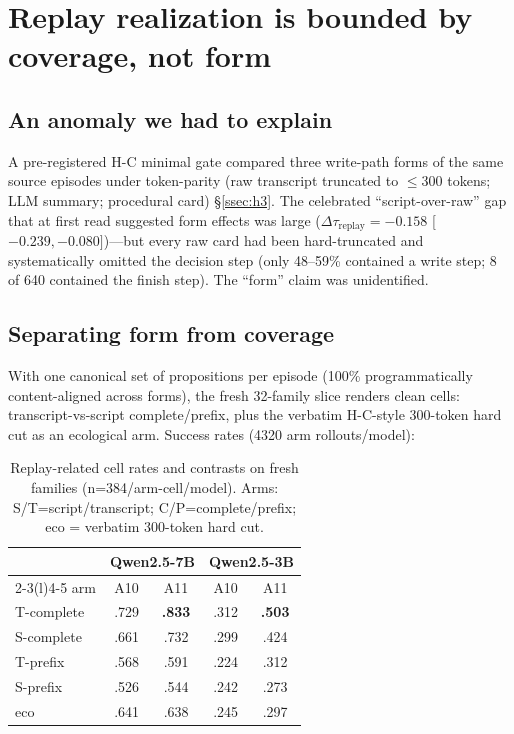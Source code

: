 \section{Replay realization is bounded by coverage, not form}
\label{sec:realization}

\subsection{An anomaly we had to explain}
\label{ssec:hc}

A pre-registered H-C minimal gate compared three write-path forms of the same source episodes under token-parity (raw transcript truncated to $\le$300 tokens; LLM summary; procedural card) \S\ref{ssec:h3}. The celebrated ``script-over-raw'' gap that at first read suggested form effects was large ($\Delta\tau_{\mathrm{replay}}=-0.158$ [$-0.239, -0.080]$)---but every raw card had been hard-truncated and systematically omitted the decision step (only 48--59\% contained a write step; 8 of 640 contained the finish step). The ``form'' claim was unidentified.

\subsection{Separating form from coverage}
\label{ssec:h3main}

With one canonical set of propositions per episode (100\% programmatically content-aligned across forms), the fresh 32-family slice renders clean cells: transcript-vs-script complete/prefix, plus the verbatim H-C-style 300-token hard cut as an ecological arm. Success rates (4320 arm rollouts/model):

\begin{table}[t]
\centering\small
\caption{Replay-related cell rates and contrasts on fresh families (n=384/arm-cell/model). Arms: S/T=script/transcript; C/P=complete/prefix; eco = verbatim 300-token hard cut.}
\label{tab:h3}
\begin{tabular}{lcc|cc}
\toprule
& \multicolumn{2}{c}{Qwen2.5-7B} & \multicolumn{2}{c}{Qwen2.5-3B} \\
\cmidrule(r){2-3}\cmidrule(l){4-5}
arm & A10 & A11 & A10 & A11 \\
\midrule
T-complete & .729 & \textbf{.833} & .312 & \textbf{.503} \\
S-complete & .661 & .732 & .299 & .424 \\
T-prefix   & .568 & .591 & .224 & .312 \\
S-prefix   & .526 & .544 & .242 & .273 \\
eco        & .641 & .638 & .245 & .297 \\
\bottomrule
\end{tabular}
\end{table}

